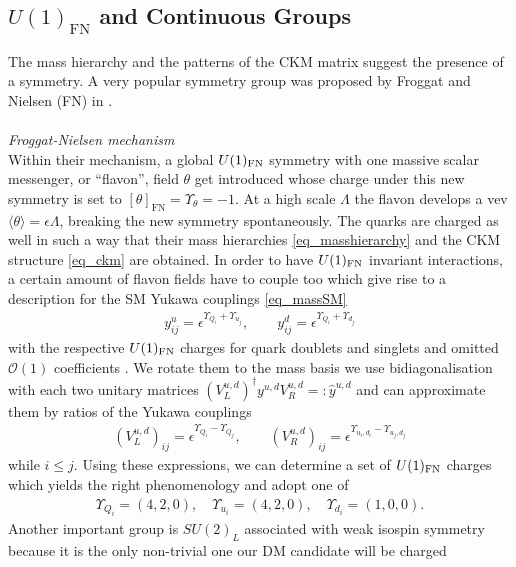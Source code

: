 \subsection{$U(1)_\text{FN}$ and Continuous Groups}
\label{sec_FNGT}
The mass hierarchy and the patterns of the CKM matrix suggest the presence of a symmetry. A very popular symmetry group was proposed
by Froggat and Nielsen (FN) in \cite{FN}. 
\\ \\ \textit{Froggat-Nielsen mechanism}\\
\noindent Within their mechanism, a global $U(1)_\text{FN}$ symmetry with one massive scalar messenger, 
or ``flavon'', field $\theta$ get introduced whose charge under this new symmetry is set to $[\theta]_\text{FN} = \Upsilon_\theta=-1$. At a high scale $\Lambda$ the
flavon develops a vev $\langle \theta \rangle = \epsilon\Lambda$, breaking the new symmetry spontaneously. The quarks are charged as well in such 
a way that their mass hierarchies \eqref{eq_masshierarchy} and the CKM structure \eqref{eq_ckm} are obtained. In order to have $U(1)_\text{FN}$ invariant
interactions, a certain amount of flavon fields have to couple too which give rise to a description for the SM Yukawa couplings \eqref{eq_massSM}
\begin{align}
 y^u_{ij} = \epsilon^{\Upsilon_{Q_i} + \Upsilon_{u_j}},\qquad y^d_{ij} = \epsilon^{\Upsilon_{Q_i} + \Upsilon_{d_j}}
 \label{eq_quarkyukawa}
\end{align}
with the respective $U(1)_\text{FN}$ charges for quark doublets and singlets and omitted $\mathcal{O}(1)$ coefficients . We rotate them to the mass basis we 
use bidiagonalisation with each two unitary
matrices ${\left(V_L^{u,d}\right)^\dagger y^{u,d}V_R^{u,d}=:\hat{y}^{u,d}}$ and can approximate them by ratios of the Yukawa couplings \cite{1501.07268}
\begin{align}
 \left(V_L^{u,d}\right)_{ij} = \epsilon^{\Upsilon_{Q_i} - \Upsilon_{Q_j}},\qquad\left(V_R^{u,d}\right)_{ij} = \epsilon^{\Upsilon_{u_i,d_i} - \Upsilon_{u_j,d_j}}
\end{align}
while $i\leq j$. Using these expressions, we can determine a set of $U(1)_\text{FN}$ charges which yields the right phenomenology and adopt one of \cite{0501071}
\begin{align}
 \Upsilon_{Q_i}=(4,2,0),\quad \Upsilon_{u_i}=(4,2,0),\quad \Upsilon_{d_i}=(1,0,0).
 \label{eq_fnchargesQ}
\end{align}
Another important group is $SU(2)_L$ associated with weak isospin symmetry because it is the only non-trivial one our DM candidate will be charged 
